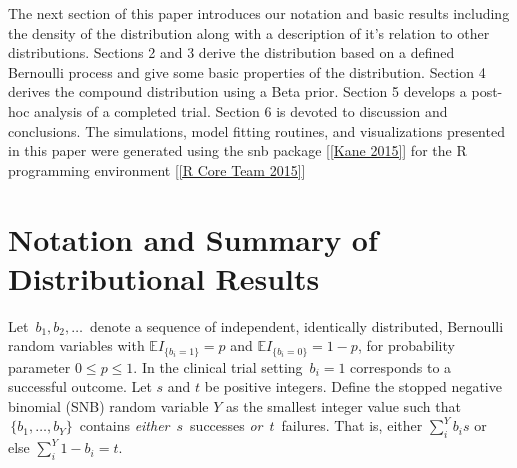 \documentclass[12pt]{article}         %
\begin{document}
The next section of this paper introduces our notation and basic results 
including the density of the distribution along with a description of 
it's relation to other distributions. Sections 2 and 3 derive the distribution 
based on a defined Bernoulli process and give some basic properties of the 
distribution. Section 4 derives the compound distribution using a Beta prior. 
Section 5 develops a post-hoc analysis of a completed trial. Section 6 is 
devoted to discussion and conclusions. The simulations, model fitting 
routines, and visualizations presented in this paper were generated using the 
snb package [\ref{Kane 2015}] for the R programming 
environment [\ref{R Core Team 2015}]



\section   {Notation and Summary of Distributional Results}
\label{notation.section}

Let $\,b_1, b_2, \ldots \,$ denote a sequence of independent, identically 
distributed, Bernoulli random variables with $\mathbb{E}I_{\{b_i=1\}}=p$ and
$\mathbb{E}I_{\{b_i = 0\}} = 1-p$, for 
probability parameter $0\leq p \leq 1$. In the clinical trial setting 
$\,b_i = 1$ corresponds to a successful outcome.  Let $s$ and $t$ be 
positive integers.  Define the stopped negative binomial (SNB) random 
variable $Y$ as the smallest 
integer value such that $\,\{b_1, \ldots , b_Y\}\,$ contains {\em either} 
$\,s\,$ successes {\em or} $\,t\,$ failures. That is, either 
$\sum_i^Y b_i s$ or else $\sum_i^Y 1-b_i = t$.
\end{document}
